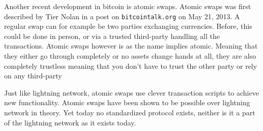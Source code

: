 
Another recent development in bitcoin is atomic swaps. Atomic swaps was first described by Tier Nolan in a post on
\texttt{bitcointalk.org} on May 21, 2013.\cite{tier_nolan}
A regular swap can for example be two parties exchanging currencies. Before,
this could be done in person, or via a trusted third-party handling all the
transactions. Atomic swaps however is as the name implies atomic. Meaning that
they either go through completely or no assets change hands at all, they are
also completely trustless meaning that you don't have to trust the
other party or rely on any third-party

Just like lightning network, atomic swaps use clever transaction scripts to
achieve new functionality. Atomic swaps have been shown to be possible over
lightning network in theory. Yet today no standardized protocol exists, neither is it a part of the lightning network as it exists today.